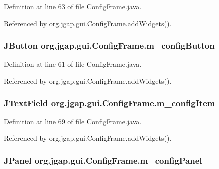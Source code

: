 Definition at line 63 of file Config\-Frame.\-java.



Referenced by org.\-jgap.\-gui.\-Config\-Frame.\-add\-Widgets().

\hypertarget{classorg_1_1jgap_1_1gui_1_1_config_frame_aeb6a7f72fe02351f0a1a12d221378df6}{
\subsubsection[{m\-\_\-config\-Button}]{\setlength{\rightskip}{0pt plus 5cm}J\-Button org.\-jgap.\-gui.\-Config\-Frame.\-m\-\_\-config\-Button\hspace{0.3cm}{\ttfamily [private]}}}\label{classorg_1_1jgap_1_1gui_1_1_config_frame_aeb6a7f72fe02351f0a1a12d221378df6}


Definition at line 61 of file Config\-Frame.\-java.



Referenced by org.\-jgap.\-gui.\-Config\-Frame.\-add\-Widgets().

\hypertarget{classorg_1_1jgap_1_1gui_1_1_config_frame_a7dd7f3fe4062fb4d797f8beb9d4a616b}{
\subsubsection[{m\-\_\-config\-Item}]{\setlength{\rightskip}{0pt plus 5cm}J\-Text\-Field org.\-jgap.\-gui.\-Config\-Frame.\-m\-\_\-config\-Item\hspace{0.3cm}{\ttfamily [private]}}}\label{classorg_1_1jgap_1_1gui_1_1_config_frame_a7dd7f3fe4062fb4d797f8beb9d4a616b}


Definition at line 69 of file Config\-Frame.\-java.



Referenced by org.\-jgap.\-gui.\-Config\-Frame.\-add\-Widgets().

\hypertarget{classorg_1_1jgap_1_1gui_1_1_config_frame_addfd6f9a6a488584fff8bc32f55c5856}{
\subsubsection[{m\-\_\-config\-Panel}]{\setlength{\rightskip}{0pt plus 5cm}J\-Panel org.\-jgap.\-gui.\-Config\-Frame.\-m\-\_\-config\-Panel\hspace{0.3cm}{\ttfamily [private]}}}\label{classorg_1_1jgap_1_1gui_1_1_config_frame_addfd6f9a6a488584fff8bc32f55c5856}


